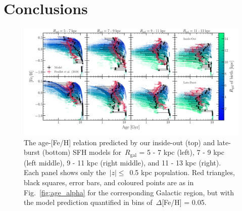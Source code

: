 \documentclass[draft2.tex]{subfiles}
\begin{document}
 

\section{Conclusions} 
\label{sec:conclusions} 

\begin{figure} 
\centering 
\includegraphics[scale = 0.35]{amr_insideout_vs_lateburst_fe.pdf} 
\caption{The age-[Fe/H] relation predicted by our inside-out (top) and 
late-burst (bottom) SFH models for~$R_\text{gal}$ = 5 - 7 kpc (left), 7 - 9 kpc 
(left middle), 9 - 11 kpc (right middle), and 11 - 13 kpc (right). Each panel 
shows only the~$\left|z\right|\leq$~0.5 kpc population. Red triangles, black 
squares, error bars, and coloured points are as in Fig.~\ref{fig:age_alpha} for 
the corresponding Galactic region, but with the model prediction quantified in 
bins of~$\Delta$[Fe/H] = 0.05. } 
\label{fig:amr_insideout_vs_lateburst_fe} 
\end{figure} 
\end{document}
